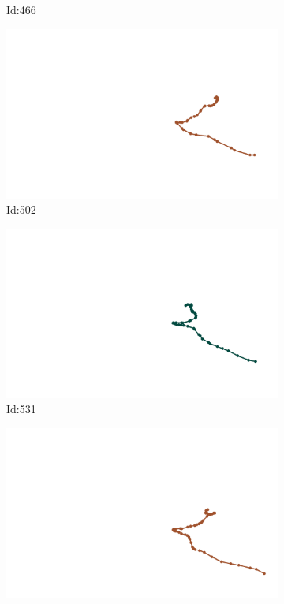 \documentclass[12pt,twoside]{report}
\begin{document}
\begin{figure}
\begin{subfigure}[b]{0.20\textwidth}
\caption{Id:466}
\end{subfigure}
\begin{subfigure}[b]{0.20\textwidth}
\centering
\includegraphics[width=\textwidth]{../../trajectories/502.png}
\caption{Id:502}
\end{subfigure}
\begin{subfigure}[b]{0.20\textwidth}
\centering
\includegraphics[width=\textwidth]{../../trajectories/531.png}
\caption{Id:531}
\end{subfigure}
\begin{subfigure}[b]{0.20\textwidth}
\centering
\includegraphics[width=\textwidth]{../../trajectories/544.png}

\end{subfigure}
\end{figure}
\end{document}

